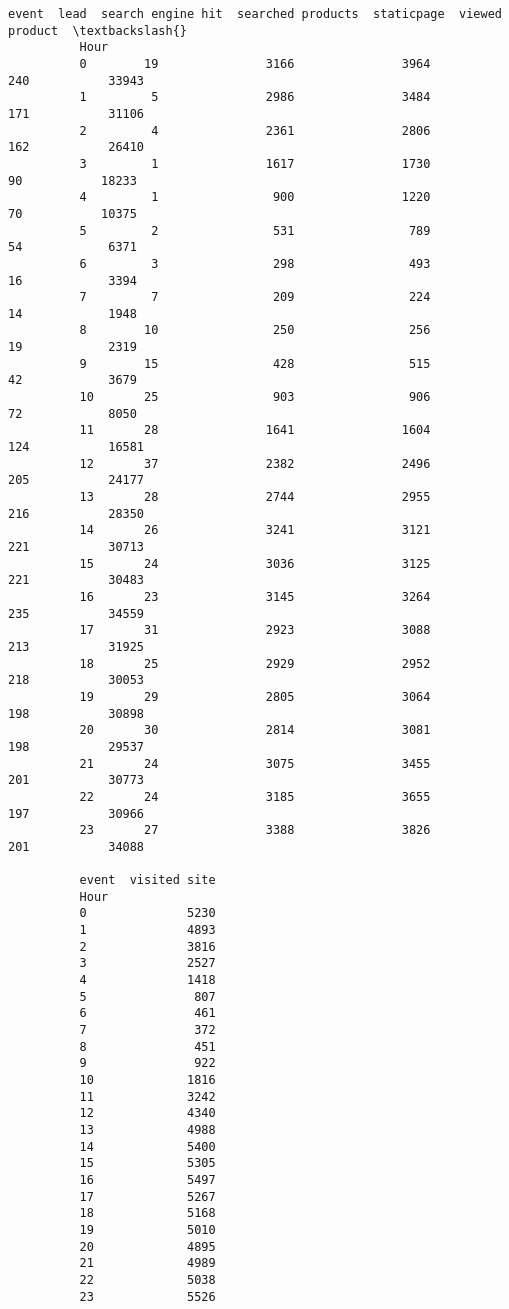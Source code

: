 \documentclass[11pt]{article}
\begin{document}
\begin{Verbatim}[commandchars=\\\{\}]
          event  lead  search engine hit  searched products  staticpage  viewed product  \textbackslash{}
          Hour                                                                            
          0        19               3166               3964         240           33943   
          1         5               2986               3484         171           31106   
          2         4               2361               2806         162           26410   
          3         1               1617               1730          90           18233   
          4         1                900               1220          70           10375   
          5         2                531                789          54            6371   
          6         3                298                493          16            3394   
          7         7                209                224          14            1948   
          8        10                250                256          19            2319   
          9        15                428                515          42            3679   
          10       25                903                906          72            8050   
          11       28               1641               1604         124           16581   
          12       37               2382               2496         205           24177   
          13       28               2744               2955         216           28350   
          14       26               3241               3121         221           30713   
          15       24               3036               3125         221           30483   
          16       23               3145               3264         235           34559   
          17       31               2923               3088         213           31925   
          18       25               2929               2952         218           30053   
          19       29               2805               3064         198           30898   
          20       30               2814               3081         198           29537   
          21       24               3075               3455         201           30773   
          22       24               3185               3655         197           30966   
          23       27               3388               3826         201           34088   
          
          event  visited site  
          Hour                 
          0              5230  
          1              4893  
          2              3816  
          3              2527  
          4              1418  
          5               807  
          6               461  
          7               372  
          8               451  
          9               922  
          10             1816  
          11             3242  
          12             4340  
          13             4988  
          14             5400  
          15             5305  
          16             5497  
          17             5267  
          18             5168  
          19             5010  
          20             4895  
          21             4989  
          22             5038  
          23             5526  
\end{Verbatim}
\end{document}

